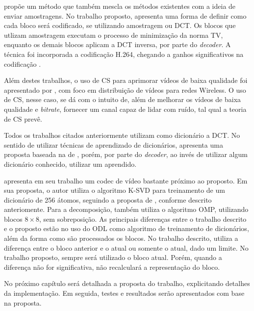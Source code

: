 \documentclass[cic,tc]{iiufrgs}
\begin{document}
\citet{ZhangVideoCS} propõe um método que também mescla os métodos existentes
com a ideia de enviar amostragens. 
No trabalho proposto, apresenta uma forma de definir como cada bloco será codificado,
se utilizando amostragem ou DCT.
Os blocos que utlizam amostragem executam o processo de minimização da norma TV, 
enquanto os demais blocos aplicam a DCT inversa, por parte do \textit{decoder}.
A técnica foi incorporada a codificação H.264, chegando a ganhos significativos na
codificação \cite{ZhangVideoCS}.

Além destes trabalhos, o uso de CS para aprimorar vídeos de baixa qualidade foi 
apresentado por \citet{WirelessXiangCai}, com foco em distribuição de vídeos para
redes Wireless.
O uso de CS, nesse caso, se dá com o intuito de, além de melhorar os vídeos de baixa
qualidade e \textit{bitrate}, fornecer um canal capaz de lidar com ruído, 
tal qual a teoria de CS prevê.

Todos os trabalhos citados anteriormente utilizam como dicionário a DCT.
No sentido de utilizar técnicas de aprendizado de dicionários, 
\citet{chen2010dictionary} apresenta uma proposta baseada na de \citet{ZhangVideoCS},
porém, por parte do \textit{decoder}, ao invés de utilizar algum dicionário conhecido,
utilizar um aprendido.

\citet{lima2012codificaccao} apresenta em seu trabalho um codec de vídeo bastante 
próximo ao proposto.
Em sua proposta, o autor utiliza o algoritmo K-SVD para treinamento de um dicionário
de 256 átomos, seguindo a proposta de \citeauthor{BRYTFACEKSVD}, conforme descrito
anteriomente.
Para a decomposição, também utiliza o algoritmo OMP, utilizando blocos $8\times8$,
sem sobreposição.
As principais diferenças entre o trabalho descrito e o proposto
estão no uso do ODL como algoritmo de treinamento de dicionários, 
além da forma como são processados os blocos.
No trabalho descrito, \citeauthor{lima2012codificaccao} utiliza a diferença entre o
bloco anterior e o atual ou somente o atual, dado um limite. 
No trabalho proposto, sempre será utilizado o bloco atual.
Porém, quando a diferença não for significativa, não recalculará a representação do bloco.

No próximo capítulo será detalhada a proposta do trabalho, explicitando detalhes
da implementação.
Em seguida, testes e resultados serão apresentados com base na proposta.
\end{document}
